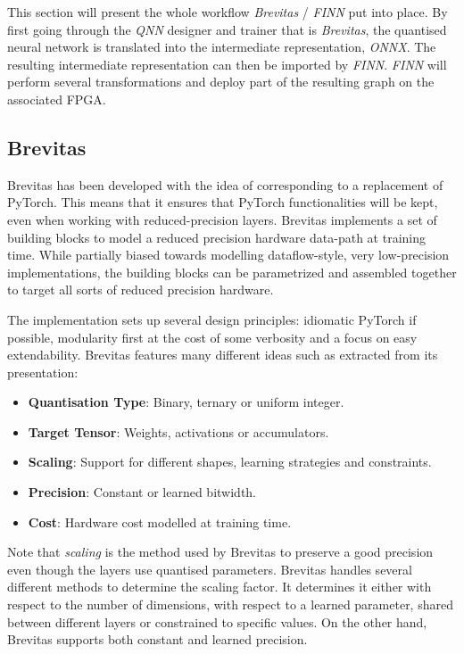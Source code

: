This section will present the whole workflow \emph{Brevitas} / \emph{FINN} put into place. By first going through the \emph{QNN} designer and trainer that is \emph{Brevitas}, the quantised neural network is translated into the intermediate representation, \emph{ONNX}. The resulting intermediate representation can then be imported by \emph{FINN}. \emph{FINN} will perform several transformations and deploy part of the resulting graph on the associated FPGA.


\subsection{Brevitas}

Brevitas has been developed with the idea of corresponding to a  replacement of PyTorch. This means that it ensures that PyTorch functionalities will be kept, even when working with reduced-precision layers. Brevitas implements a set of building blocks to model a reduced precision hardware data-path at training time. While partially biased towards modelling dataflow-style, very low-precision implementations, the building blocks can be parametrized and assembled together to target all sorts of reduced precision hardware.

The implementation sets up several design principles: idiomatic PyTorch if possible, modularity first at the cost of some verbosity and a focus on easy extendability. Brevitas features many different ideas such as extracted from its presentation:
\begin{itemize}
  \item \textbf{Quantisation Type}: Binary, ternary or uniform integer.
  \item \textbf{Target Tensor}: Weights, activations or accumulators.
  \item \textbf{Scaling}: Support for different shapes, learning strategies and constraints.
  \item \textbf{Precision}: Constant or learned bitwidth.
  \item \textbf{Cost}: Hardware cost modelled at training time.
\end{itemize}

Note that \emph{scaling} is the method used by Brevitas to preserve a good precision even though the layers use quantised parameters. Brevitas handles several different methods to determine the scaling factor. It determines it either with respect to the number of dimensions, with respect to a learned parameter, shared between different layers or constrained to specific values. On the other hand, Brevitas supports both constant and learned precision.

